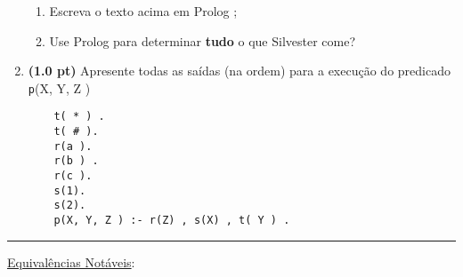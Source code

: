 \documentclass[11pt, a4paper,final]{article}
\begin{document}
\begin{enumerate}
\begin{enumerate}
  \item Escreva o texto acima em Prolog ;
  \item Use Prolog para determinar {\bf tudo} o que Silvester come?
\end{enumerate}

\item {\bf (1.0 pt)} Apresente todas as saídas (na ordem) para a execução do predicado {\texttt p(X, Y, Z )}

\begin{verbatim}
	t( * ) .
	t( # ).
	r(a ).
	r(b ) .
	r(c ).
	s(1).
	s(2).
	p(X, Y, Z ) :- r(Z) , s(X) , t( Y ) .
\end{verbatim}



\end{enumerate}


\noindent\rule{0.8\textwidth}{2pt}



\underline{{\large Equivalências Notáveis}}:
\end{document}

